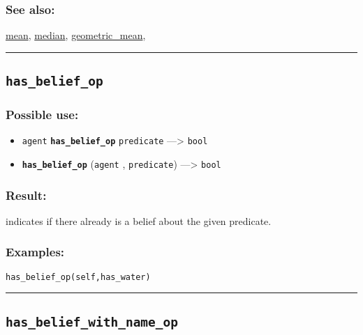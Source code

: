 \documentclass[]{book}
\providecommand{\tightlist}{%
  \setlength{\itemsep}{0pt}\setlength{\parskip}{0pt}}
\theoremstyle{definition}
\theoremstyle{definition}
\theoremstyle{definition}
\theoremstyle{remark}
\begin{document}
\subsubsection{See also:}\label{see-also-110}

\href{OperatorsIM\#mean}{mean}, \href{OperatorsIM\#median}{median},
\href{OperatorsDH\#geometric_mean}{geometric\_mean},

\begin{center}\rule{0.5\linewidth}{\linethickness}\end{center}

\subsection{\texorpdfstring{\texttt{has\_belief\_op}}{has\_belief\_op}}\label{has_belief_op}

\subsubsection{Possible use:}\label{possible-use-246}

\begin{itemize}
\tightlist
\item
  \texttt{agent} \textbf{\texttt{has\_belief\_op}} \texttt{predicate}
  ---\textgreater{} \texttt{bool}
\item
  \textbf{\texttt{has\_belief\_op}} (\texttt{agent} ,
  \texttt{predicate}) ---\textgreater{} \texttt{bool}
\end{itemize}

\subsubsection{Result:}\label{result-237}

indicates if there already is a belief about the given predicate.

\subsubsection{Examples:}\label{examples-186}

\begin{verbatim}
has_belief_op(self,has_water) 
\end{verbatim}

\begin{center}\rule{0.5\linewidth}{\linethickness}\end{center}

\subsection{\texorpdfstring{\texttt{has\_belief\_with\_name\_op}}{has\_belief\_with\_name\_op}}\label{has_belief_with_name_op}
\end{document}
